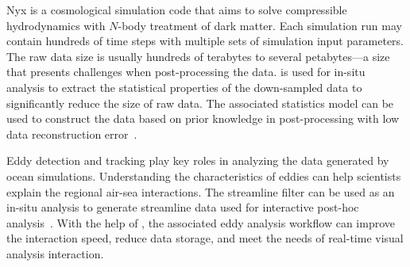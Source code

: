 Nyx is a cosmological simulation code that aims to solve compressible hydrodynamics with $N$-body treatment of dark matter. Each simulation run may contain hundreds of time steps with multiple sets of simulation input parameters. The raw data size is usually hundreds of terabytes to several petabytes---a size that presents challenges when post-processing the data. 
\vtkm is used for in-situ analysis to extract the statistical properties of the down-sampled data to significantly reduce the size of raw data. The associated statistics model can be used to construct the data based on prior knowledge in post-processing with low data reconstruction error~\citep{Wang2019}.

Eddy detection and tracking play key roles in analyzing the data generated by ocean simulations. Understanding the characteristics of eddies can help scientists explain the regional air-sea interactions.
The \vtkm streamline filter can be used as an in-situ analysis to generate streamline data used for interactive post-hoc analysis~\citep{Han2022}. With the help of \vtkm, the associated eddy analysis workflow can improve the interaction speed, reduce data storage, and meet the
needs of real-time visual analysis interaction.  

